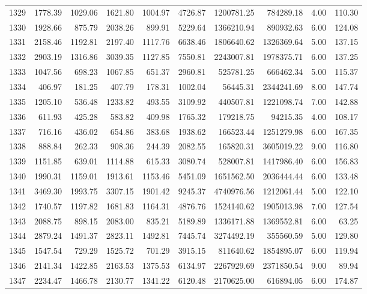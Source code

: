 \begin{tabular}{lrrrrrrrrr}
1329 & 1778.39 & 1029.06 & 1621.80 & 1004.97 & 4726.87 & 1200781.25 & 784289.18 & 4.00 & 110.30 \\
1330 & 1928.66 & 875.79 & 2038.26 & 899.91 & 5229.64 & 1366210.94 & 890932.63 & 6.00 & 124.08 \\
1331 & 2158.46 & 1192.81 & 2197.40 & 1117.76 & 6638.46 & 1806640.62 & 1326369.64 & 5.00 & 137.15 \\
1332 & 2903.19 & 1316.86 & 3039.35 & 1127.85 & 7550.81 & 2243007.81 & 1978375.71 & 6.00 & 137.25 \\
1333 & 1047.56 & 698.23 & 1067.85 & 651.37 & 2960.81 & 525781.25 & 666462.34 & 5.00 & 115.37 \\
1334 & 406.97 & 181.25 & 407.79 & 178.31 & 1002.04 & 56445.31 & 2344241.69 & 8.00 & 147.74 \\
1335 & 1205.10 & 536.48 & 1233.82 & 493.55 & 3109.92 & 440507.81 & 1221098.74 & 7.00 & 142.88 \\
1336 & 611.93 & 425.28 & 583.82 & 409.98 & 1765.32 & 179218.75 & 94215.35 & 4.00 & 108.17 \\
1337 & 716.16 & 436.02 & 654.86 & 383.68 & 1938.62 & 166523.44 & 1251279.98 & 6.00 & 167.35 \\
1338 & 888.84 & 262.33 & 908.36 & 244.39 & 2082.55 & 165820.31 & 3605019.22 & 9.00 & 116.80 \\
1339 & 1151.85 & 639.01 & 1114.88 & 615.33 & 3080.74 & 528007.81 & 1417986.40 & 6.00 & 156.83 \\
1340 & 1990.31 & 1159.01 & 1913.61 & 1153.46 & 5451.09 & 1651562.50 & 2036444.44 & 6.00 & 133.48 \\
1341 & 3469.30 & 1993.75 & 3307.15 & 1901.42 & 9245.37 & 4740976.56 & 1212061.44 & 5.00 & 122.10 \\
1342 & 1740.57 & 1197.82 & 1681.83 & 1164.31 & 4876.76 & 1524140.62 & 1905013.98 & 7.00 & 127.54 \\
1343 & 2088.75 & 898.15 & 2083.00 & 835.21 & 5189.89 & 1336171.88 & 1369552.81 & 6.00 & 63.25 \\
1344 & 2879.24 & 1491.37 & 2823.11 & 1492.81 & 7445.74 & 3274492.19 & 355560.59 & 5.00 & 129.80 \\
1345 & 1547.54 & 729.29 & 1525.72 & 701.29 & 3915.15 & 811640.62 & 1854895.07 & 6.00 & 119.94 \\
1346 & 2141.34 & 1422.85 & 2163.53 & 1375.53 & 6134.97 & 2267929.69 & 2371850.54 & 9.00 & 89.94 \\
1347 & 2234.47 & 1466.78 & 2130.77 & 1341.22 & 6120.48 & 2170625.00 & 616894.05 & 6.00 & 174.87 \\

\end{tabular}
